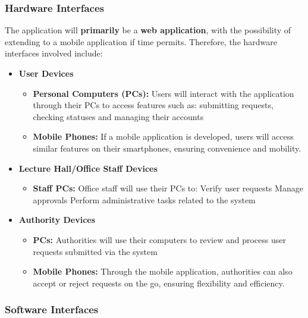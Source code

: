 \documentclass[a4paper,12pt]{article}
\begin{document}
\subsubsection{Hardware Interfaces} 
The application will \textbf{primarily} be a \textbf{web application}, with the possibility of extending to a mobile application if time permits. Therefore, the hardware interfaces involved include:
\begin{itemize}
    \item \textbf{User Devices}
    \begin{itemize} 
        \item \textbf{Personal Computers (PCs):} Users will interact with the application through their PCs to access features such as: submitting requests, checking statuses and managing their accounts
        \item \textbf{Mobile Phones:} If a mobile application is developed, users will access similar features on their smartphones, ensuring convenience and mobility.
    \end{itemize}
    
    \item \textbf{Lecture Hall/Office Staff Devices}
    \begin{itemize} 
        \item \textbf{Staff PCs:} Office staff will use their PCs to:
            Verify user requests
            Manage approvals
            Perform administrative tasks related to the system
    \end{itemize}
    
    \item \textbf{Authority Devices}
    \begin{itemize} 
        \item \textbf{PCs:} Authorities will use their computers to review and process user requests submitted via the system
        \item \textbf{Mobile Phones:} Through the mobile application, authorities can also accept or reject requests on the go, ensuring flexibility and efficiency.
    \end{itemize}
\end{itemize}

\subsubsection{Software Interfaces}
\end{document}

